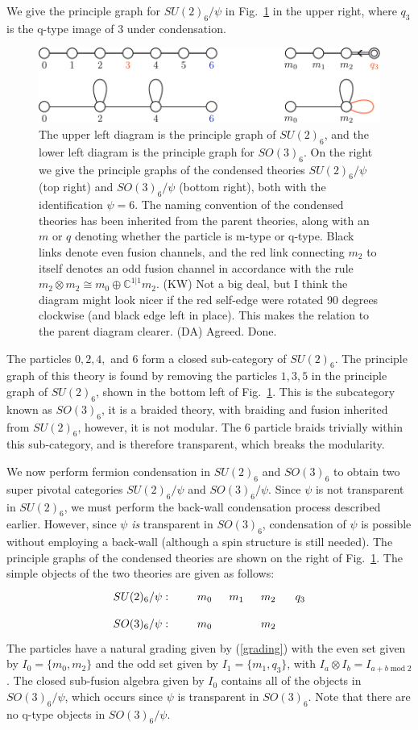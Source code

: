 \documentclass[12pt,a4paper]{article}
\newcommand{\tp}{\otimes}
\newcommand{\cc}{\mathbb{C}}
\newcommand{\dave}[1]{{\color{ao(english)}\footnotesize{(DA) #1}}}
\newcommand{\kw}[1]{{\color{kwcolor}\footnotesize{(KW) #1}}}
\begin{document}
We give the principle graph for $SU(2)_6/\psi$ in Fig.~\ref{SUSOsix} in the upper right, where $q_3$ is the q-type image of $3$ under condensation.
\begin{figure} 
\centering
\includegraphics{SU26SO36Dynkin.pdf}
\caption{\label{SUSOsix} The upper left diagram is the principle graph of $SU(2)_6$, and the 
lower left diagram is the principle graph for $SO(3)_6$. 
On the right we give the principle graphs of the condensed theories $SU(2)_6/\psi$ (top right) and 
$SO(3)_6/\psi$ (bottom right), both with the identification $\psi=6$. 
The naming convention of the condensed theories has been inherited from the parent theories, 
along with an $m$ or $q$ denoting whether the particle is m-type or q-type.
Black links denote even fusion channels, and the red link connecting $m_2$ to itself 
denotes an odd fusion channel in accordance with the rule $m_2\tp m_2 \cong m_0 \oplus \cc^{1|1}m_2$. 
\kw{Not a big deal, but I think the diagram might look nicer if the red self-edge were rotated 90 degrees clockwise (and
black edge left in place).
This makes the relation to the parent diagram clearer.}
\dave{Agreed. Done.}
}
\end{figure}
The particles $0,2,4,$ and $6$ form a closed sub-category of $SU(2)_6$. 
The principle graph of this theory is found by removing the particles $1,3,5$ in the principle graph of $SU(2)_6$, shown in the bottom left of Fig.~\ref{SUSOsix}. 
This is the subcategory known as $SO(3)_6$, it is a braided theory, with braiding and fusion inherited from $SU(2)_6$, however, it is not modular.
The $6$ particle braids trivially within this sub-category, and is therefore transparent, which breaks the modularity.

We now perform fermion condensation in $SU(2)_6$ and $SO(3)_6$ to obtain two super pivotal categories $SU(2)_6/\psi$ and $SO(3)_6/\psi$. 
Since $\psi$ is not transparent in $SU(2)_6$, we must perform the back-wall condensation process described earlier. 
However, since $\psi$ {\it is} transparent in $SO(3)_6$, condensation of $\psi$ is possible without employing a back-wall (although a spin structure is still needed). 
The principle graphs of the condensed theories are shown on the right of Fig.~\ref{SUSOsix}.
The simple objects of the two theories are given as follows:
\begin{align}
\xymatrix @!0 @M=1mm @C=10mm {
SU(2)_6/\psi:&&m_0 & m_1 & m_2 & q_3 \\
SO(3)_6/ \psi:&&m_0 && m_2& 
}
\end{align}
The particles have a natural grading given by (\ref{grading}) with the even set given by $I_0 = \{ m_0, m_2 \}$ and the odd set given by $I_1 = \{m_1, q_3\}$, with $I_a \tp I_b = I_{a+b \;  \text{mod} \; 2}$.
The closed sub-fusion algebra given by $I_0$ contains all of the objects in $SO(3)_6/\psi$, 
which occurs since $\psi$ is transparent in $SO(3)_6$. 
Note that there are no q-type objects in $SO(3)_6/\psi$. 
\end{document}
